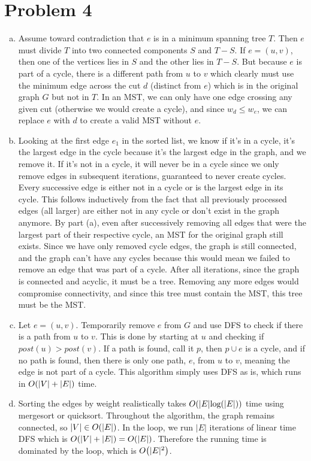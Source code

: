 \documentclass[11pt]{article}
\let\origleft\left
\let\origright\right
\renewcommand{\left}{\mathopen{}\mathclose\bgroup\origleft}
\renewcommand{\right}{\aftergroup\egroup\origright}
\newcommand{\p}[1]{\left(#1\right)}
\renewcommand{\log}[1]{\text{log}\p{#1}}
\newcommand{\BigOh}[1]{O\p{#1}}
\begin{document}
\section*{Problem 4}
\begin{enumerate}[(a)]
\item Assume toward contradiction that $e$ is in a minimum spanning tree $T$. Then $e$ must divide $T$ into two connected components $S$ and $T-S$. If $e=(u,v)$, then one of the vertices lies in $S$ and the other lies in $T-S$. But because $e$ is part of a cycle, there is a different path from $u$ to $v$ which clearly must use the minimum edge across the cut $d$ (distinct from $e$) which is in the original graph $G$ but not in $T$. In an MST, we can only have one edge crossing any given cut (otherwise we would create a cycle), and since $w_d \leq w_e$, we can replace $e$ with $d$ to create a valid MST without $e$.
\item Looking at the first edge $e_1$ in the sorted list, we know if it's in a cycle, it's the largest edge in the cycle because it's the largest edge in the graph, and we remove it. If it's not in a cycle, it will never be in a cycle since we only remove edges in subsequent iterations, guaranteed to never create cycles. Every successive edge is either not in a cycle or is the largest edge in its cycle. This follows inductively from the fact that all previously processed edges (all larger) are either not in any cycle or don't exist in the graph anymore. By part (a), even after successively removing all edges that were the largest part of their respective cycle, an MST for the original graph still exists. Since we have only removed cycle edges, the graph is still connected, and the graph can't have any cycles because this would mean we failed to remove an edge that was part of a cycle. After all iterations, since the graph is connected and acyclic, it must be a tree. Removing any more edges would compromise connectivity, and since this tree must contain the MST, this tree must be the MST.
\item Let $e=(u,v)$. Temporarily remove $e$ from $G$ and use DFS to check if there is a path from $u$ to $v$. This is done by starting at $u$ and checking if $post(u)>post(v)$. If a path is found, call it $p$, then $p\cup e$ is a cycle, and if no path is found, then there is only one path, $e$, from $u$ to $v$, meaning the edge is not part of a cycle. This algorithm simply uses DFS as is, which runs in $\BigOh{|V|+|E|}$ time.
\item Sorting the edges by weight realistically takes $\BigOh{|E|\log{|E|}}$ time using mergesort or quicksort. Throughout the algorithm, the graph remains connected, so $|V| \in \BigOh{|E|}$. In the loop, we run $|E|$ iterations of linear time DFS which is $\BigOh{|V|+|E|} = \BigOh{|E|}$. Therefore the running time is dominated by the loop, which is $\BigOh{|E|^2}$.
\end{enumerate}
\end{document}
